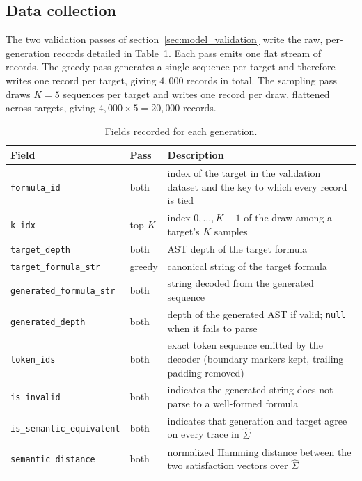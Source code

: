 \documentclass[titlepage,a4paper,11pt]{report}
\begin{document}
    \subsection{Data collection}\label{sec:data_collection}
    The two validation passes of section~\ref{sec:model_validation} write the raw, per-generation records detailed in Table~\ref{tab:validation_record_schema}. Each pass emits one flat stream of records. The greedy pass generates a single sequence per target and therefore writes one record per target, giving $4{,}000$ records in total. The sampling pass draws $K = 5$ sequences per target and writes one record per draw, flattened across targets, giving $4{,}000 \times 5 = 20{,}000$ records.

    \begin{table}[ht]
        \centering
        \caption{Fields recorded for each generation.}
        \label{tab:validation_record_schema}
        \begin{tabular}{l l p{7.4cm}}
            \toprule
            Field & Pass & Description \\
            \midrule
            \texttt{formula\_id}                & both    & index of the target in the validation dataset and the key to which every record is tied \\
            \texttt{k\_idx}                     & top-$K$ & index $0,\dots,K{-}1$ of the draw among a target's $K$ samples \\
            \texttt{target\_depth}              & both    & AST depth of the target formula \\
            \texttt{target\_formula\_str}       & greedy  & canonical string of the target formula \\
            \texttt{generated\_formula\_str}    & both    & string decoded from the generated sequence \\
            \texttt{generated\_depth}           & both    & depth of the generated AST if valid; \texttt{null} when it fails to parse \\
            \texttt{token\_ids}                 & both    & exact token sequence emitted by the decoder (boundary markers kept, trailing padding removed) \\
            \texttt{is\_invalid}                & both    & indicates the generated string does not parse to a well-formed formula \\
            \texttt{is\_semantic\_equivalent}   & both    & indicates that generation and target agree on every trace in $\widehat\Sigma$ \\
            \texttt{semantic\_distance}         & both    & normalized Hamming distance between the two satisfaction vectors over $\widehat\Sigma$ \\
            \bottomrule
        \end{tabular}
    \end{table}
\end{document}
